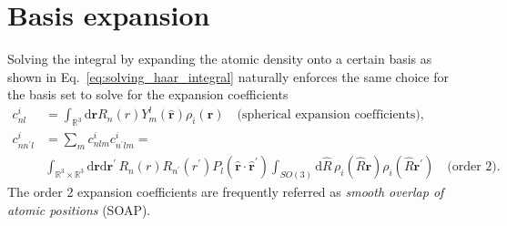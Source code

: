 \section{Basis expansion}
Solving the integral by expanding the atomic density onto a certain basis as shown in Eq.~\ref{eq:solving_haar_integral} naturally enforces the same choice for the basis set to solve for the expansion coefficients
\begin{subequations}
\label{eq:acdc_expansion}
\begin{align}
    \label{eq:gaussian_expansion}
    c^i_{nl} &= \int_{\mathbb{R}^3}\mathrm{d}\mathbf{r} R_n(r)Y_m^l(\hat{\mathbf{r}})\rho_i(\mathbf{r})\quad\textrm{(spherical expansion coefficients),}\\
    c^i_{nn^\prime l} &= \sum_m c^i_{nlm}c^i_{n^\prime lm} = \nonumber \\
    \label{eq:soap_expansion}
                         &\int_{\mathbb{R}^3\times\mathbb{R}^3}\mathrm{d}\mathbf{r}\mathrm{d}\mathbf{r}^\prime\, R_n(r)R_{n^\prime}(r^\prime)P_l(\hat{\mathbf{r}}\cdot\hat{\mathbf{r}}^\prime) \int_{SO(3)}\mathrm{d}\hat{R}\,\rho_i(\hat{R}\mathbf{r})\rho_i(\hat{R}\mathbf{r}^\prime)\quad\textrm{(order 2)}.
\end{align}
\end{subequations}
The order 2 expansion coefficients are frequently referred as \emph{smooth overlap of atomic positions} (SOAP)\cite{bartok2013representing}.

